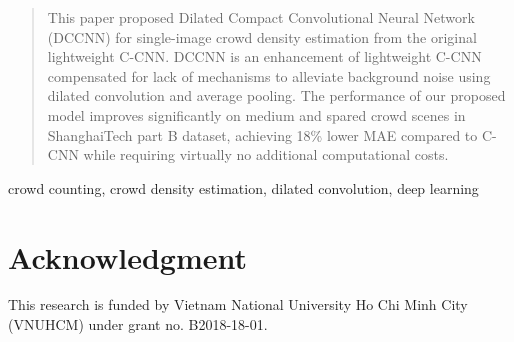 \documentclass[conference]{IEEEtran}
\begin{document}
\begin{abstract}
This paper proposed Dilated Compact Convolutional Neural Network (DCCNN) for single-image crowd density estimation from the original lightweight C-CNN.  DCCNN is an enhancement of lightweight C-CNN compensated for lack of mechanisms to alleviate background noise using dilated convolution and average pooling. The performance of our proposed model improves significantly on medium and spared crowd scenes in ShanghaiTech part B dataset, achieving 18\% lower MAE compared to C-CNN while requiring virtually no additional computational costs.
\end{abstract}

\begin{IEEEkeywords}
crowd counting, crowd density estimation, dilated
convolution, deep learning
\end{IEEEkeywords}


 













\section*{Acknowledgment}

This research is funded by Vietnam National University Ho Chi Minh City (VNUHCM) under grant no. B2018-18-01.



\end{document}
